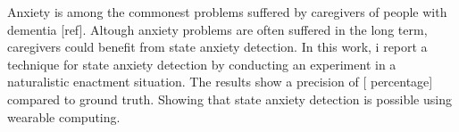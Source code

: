 Anxiety is among the commonest problems suffered by caregivers of people with dementia [ref]. Altough anxiety problems are often suffered in the long term, caregivers could benefit from state anxiety detection. In this work, i report a technique for state anxiety detection by conducting an experiment in a naturalistic enactment situation. The results show a precision of [ percentage] compared to ground truth. Showing that state anxiety detection is possible using wearable computing.
